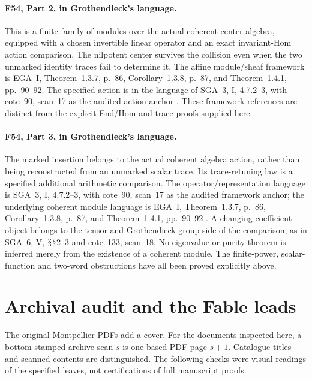 \documentclass[11pt,a4paper]{article}
\renewcommand{\S}{\ensuremath{\mathsection}}
\newcommand{\fid}[1]{\textsf{#1}}\newcommand{\gate}[1]{\textsf{#1}}
\theoremstyle{named}\newtheorem{finding}{Finding}[section]
\theoremstyle{definition}\newtheorem{definition}[finding]{Definition}
\theoremstyle{remark}\newtheorem{remark}[finding]{Remark}
\begin{document}
\paragraph{\fid{F54}, Part 2, in Grothendieck's language.}
This is a finite family of modules over the actual
coherent center algebra, equipped with a chosen invertible
linear operator and an exact invariant-Hom action comparison.
The nilpotent center survives the collision even when
the two unmarked identity traces fail to determine it.
The affine module/sheaf framework is EGA~I,
Theorem~1.3.7, p.~86, Corollary~1.3.8, p.~87, and
Theorem~1.4.1, pp.~90--92.
The specified action is in the language of SGA~3, I,
4.7.2--3, with cote~90, scan~17 as the audited action
anchor \cite{EGA,SGA3,Archive}.
These framework references are distinct from the
explicit End/Hom and trace proofs supplied here.

\paragraph{\fid{F54}, Part 3, in Grothendieck's language.}
The marked insertion belongs to the actual coherent
algebra action, rather than being reconstructed from an
unmarked scalar trace.
Its trace-retuning law is a specified additional
arithmetic comparison.
The operator/representation language is SGA~3, I,
4.7.2--3, with cote~90, scan~17 as the audited framework
anchor; the underlying coherent module language is
EGA~I, Theorem~1.3.7, p.~86, Corollary~1.3.8, p.~87,
and Theorem~1.4.1, pp.~90--92
\cite{SGA3,EGA,Archive}.
A changing coefficient object belongs to the tensor
and Grothendieck-group side of the comparison, as in
SGA~6, V, \S\S2--3 and cote~133, scan~18.
No eigenvalue or purity theorem is inferred merely
from the existence of a coherent module.
The finite-power, scalar-function and two-word
obstructions have all been proved explicitly above.

\section{Archival audit and the Fable leads}\label{sec:archive}
The original Montpellier PDFs add a cover. For the documents inspected here, a bottom-stamped archive scan $s$ is one-based PDF page $s+1$. Catalogue titles and scanned contents are distinguished. The following checks were visual readings of the specified leaves, not certifications of full manuscript proofs.
\end{document}

